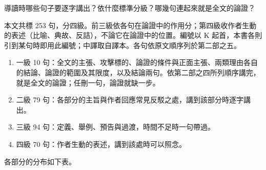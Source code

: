 \providecommand{\keyentry}[7]{%
  \par\addvspace{1.6ex}\noindent
  \begin{minipage}[t]{4.6em}\raggedright\setlength{\parskip}{0pt}%
    \ifnum#1=3 \small\fi
    \makebox[1.1em][l]{\ifcase#1\or ●\or ○\or\or ～\fi}#2\par
    {\scriptsize\textcolor{dimink}{#3}}\end{minipage}%
  \begin{minipage}[t]{\dimexpr\linewidth-4.6em\relax}\raggedright\setlength{\parskip}{0.4ex}%
    \ifnum#1=3 \small\fi
    \if\relax\detokenize{#4}\relax\else\noindent{\small\textcolor{dimink}{#4}}\par\fi
    {\setstretch{1.2}\noindent #6\par}\nopagebreak
    {\ifnum#1=3 \footnotesize\else\small\fi\setstretch{1.3}\noindent\textcolor{dimink}{#5}\par}\nopagebreak
    {\ifnum#1=3 \footnotesize\else\small\fi\setstretch{1.3}\noindent\textcolor{dimink}{理由}\quad #7\par}\end{minipage}\par}


\begin{qaquestion}
導讀時哪些句子要逐字講出？依什麼標準分級？哪幾句連起來就是全文的論證？
\end{qaquestion}

本文共標 253 句，分四級。前三級依各句在論證中的作用分；第四級收作者生動的表述（比喻、典故、反詰），不論它在論證中的位置。編號以 K 起首，本書各則引到某句時即用此編號；中譯取自譯本。各句依原文順序列於第二部之五。

\begin{enumerate}
\item 一級 10 句：全文的主張、攻擊標的、論證的條件與正面主張、兩類理由各自的結論、論證的範圍及其限度，以及結論兩句。依第二部之四所列順序講完，就是全文的論證；任刪一句，論證就缺一步。
\item 二級 79 句：各部分的主旨與作者回應常見反駁之處，講到該部分時逐字講出。
\item 三級 94 句：定義、舉例、預告與過渡，時間不足時一句帶過。
\item 四級 70 句：作者生動的表述，講到該處時可以照念。
\end{enumerate}

各部分的分布如下表。

